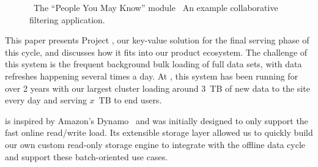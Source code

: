 \begin{figure}
\centering
{}


\caption{~The ``People You May Know'' module
~An example collaborative filtering
application.}
\end{figure}

This paper presents Project \projectname{}, our key-value solution for
the final serving phase of this cycle, and discusses how it fits into
our product ecosystem. The challenge of this system is the frequent
background bulk loading of full data sets, with data refreshes
happening several times a day. At \linkedin, this system has been
running for over 2 years with our largest cluster loading around 3~TB
of new data to the site every day and serving $x$~TB to end users. 

\projectname{} is inspired by Amazon's Dynamo~\cite{dynamo} and was
initially designed to only support the fast online read/write load.
Its extensible storage layer allowed us to quickly build our own
custom read-only storage engine to integrate with the offline data
cycle and support these batch-oriented use cases.

